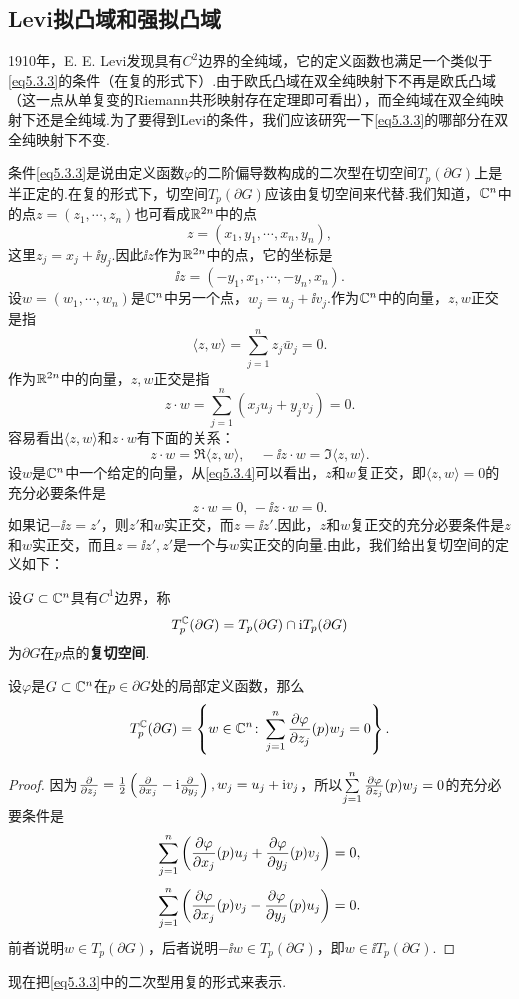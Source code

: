 \subsection{Levi拟凸域和强拟凸域}
1910年，E. E. Levi发现具有$C^2$边界的全纯域，它的定义函数也满足一个类似于\eqref{eq5.3.3}的条件（在复的形式下）.由于欧氏凸域在双全纯映射下不再是欧氏凸域（这一点从单复变的Riemann共形映射存在定理即可看出），而全纯域在双全纯映射下还是全纯域.为了要得到Levi的条件，我们应该研究一下\eqref{eq5.3.3}的哪部分在双全纯映射下不变.

条件\eqref{eq5.3.3}是说由定义函数$\varphi$的二阶偏导数构成的二次型在切空间$T_p(\partial G)$上是半正定的.在复的形式下，切空间$T_p(\partial G)$应该由复切空间来代替.我们知道，$\mathbb C^n$中的点$z=(z_1,\cdots,z_n)$也可看成$\mathbb R^{2n}$中的点
\[z=(x_1,y_1,\cdots,x_n,y_n),\]
这里$z_j=x_j+\ii y_j$.因此$\ii z$作为$\mathbb R^{2n}$中的点，它的坐标是
\[\ii z=(-y_1,x_1,\cdots,-y_n,x_n).\]
设$w=(w_1,\cdots,w_n)$是$\mathbb C^n$中另一个点，$w_j=u_j+\ii v_j$.作为$\mathbb C^n$中的向量，$z,w$正交是指
\[\langle z,w\rangle=\sum_{j=1}^{n}z_j\bar{w}_j=0.\]
作为$\mathbb R^{2n}$中的向量，$z,w$正交是指
\[z\cdot w=\sum_{j=1}^{n}(x_ju_j+y_jv_j)=0.\]
容易看出$\langle z,w\rangle$和$z\cdot w$有下面的关系：
\begin{equation}\label{eq5.3.4}
	z\cdot w=\Re\langle z,w\rangle,\quad -\ii z\cdot w=\Im\langle z,w\rangle.
\end{equation}
设$w$是$\mathbb C^n$中一个给定的向量，从\eqref{eq5.3.4}可以看出，$z$和$w$复正交，即$\langle z,w\rangle=0$的充分必要条件是
\[z\cdot w=0,\,-\ii z\cdot w=0.\]
如果记$-\ii z=z'$，则$z'$和$w$实正交，而$z=\ii z'$.因此，$z$和$w$复正交的充分必要条件是$z$和$w$实正交，而且$z=\ii z',z'$是一个与$w$实正交的向量.由此，我们给出复切空间的定义如下：
\begin{definition}\label{def5.3.3}
	设$G\subset\mathbb C^n$具有$C^1$边界，称
	\[T_p^\mathbb C(\partial G)=T_p(\partial G)\cap\mathrm i T_p(\partial G)\]
	为$\partial G$在$p$点的\textbf{复切空间}.
\end{definition}
\begin{prop}\label{prop5.3.4}
	设$\varphi$是$G\subset\mathbb C^n$在$p\in\partial G$处的局部定义函数，那么
	\[T_p^\mathbb C(\partial G)=\left\{w\in\mathbb C^n\colon\sum_{j=1}^{n}\frac{\partial \varphi}{\partial z_j}(p)w_j=0\right\}.\]
\end{prop}
\begin{proof}
	因为$\frac{\partial }{\partial z_j}=\frac12\left(\frac{\partial }{\partial x_j}-\mathrm i\frac{\partial }{\partial y_j}\right),w_j=u_j+\mathrm i v_j$，所以$\sum\limits_{j=1}^n \frac{\partial \varphi}{\partial z_j}(p)w_j=0$的充分必要条件是
	\[\sum_{j=1}^{n}\left(\frac{\partial \varphi}{\partial x_j}(p)u_j+\frac{\partial \varphi}{\partial y_j}(p)v_j\right)=0,\]
	\[\sum_{j=1}^{n}\left(\frac{\partial \varphi}{\partial x_j}(p)v_j-\frac{\partial \varphi}{\partial y_j}(p)u_j\right)=0.\]
	前者说明$w\in T_p(\partial G)$，后者说明$-\ii w\in T_p(\partial G)$，即$w\in\ii T_p(\partial G)$.
\end{proof}
现在把\eqref{eq5.3.3}中的二次型用复的形式来表示.

